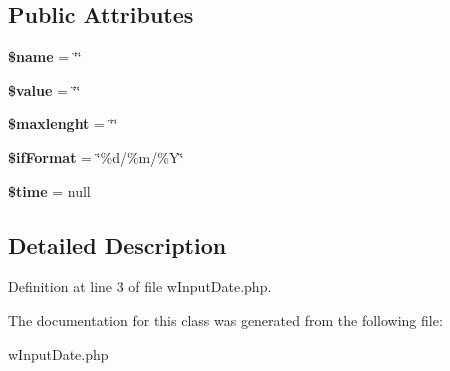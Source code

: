 \subsection*{Public Attributes}
\begin{DoxyCompactItemize}
\item 
\hypertarget{classwInputDate_a82f782746f99b28b24e516f4c597eae0}{
{\bfseries \$name} = \char`\"{}\char`\"{}}
\label{classwInputDate_a82f782746f99b28b24e516f4c597eae0}

\item 
\hypertarget{classwInputDate_a480be68d95530081db314a6ae1950619}{
{\bfseries \$value} = \char`\"{}\char`\"{}}
\label{classwInputDate_a480be68d95530081db314a6ae1950619}

\item 
\hypertarget{classwInputDate_abc5eef2df4be56f08e6a70cf6060491b}{
{\bfseries \$maxlenght} = \char`\"{}\char`\"{}}
\label{classwInputDate_abc5eef2df4be56f08e6a70cf6060491b}

\item 
\hypertarget{classwInputDate_ad73c966330705513d4673024952989e1}{
{\bfseries \$ifFormat} = \char`\"{}\%d/\%m/\%Y\char`\"{}}
\label{classwInputDate_ad73c966330705513d4673024952989e1}

\item 
\hypertarget{classwInputDate_a41300a265a6a56a640b5dcafadc60a0d}{
{\bfseries \$time} = null}
\label{classwInputDate_a41300a265a6a56a640b5dcafadc60a0d}

\end{DoxyCompactItemize}


\subsection{Detailed Description}


Definition at line 3 of file wInputDate.php.



The documentation for this class was generated from the following file:\begin{DoxyCompactItemize}
\item 
wInputDate.php\end{DoxyCompactItemize}
